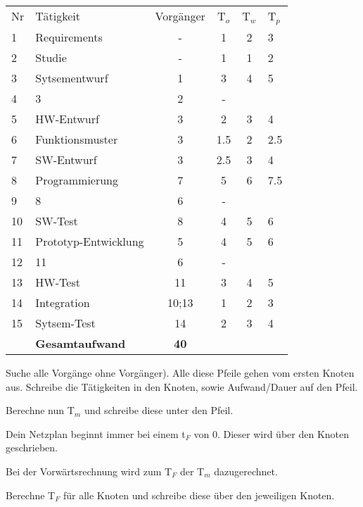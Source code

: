 \documentclass{beamer}
\begin{document}
\begin{frame}[t,shrink=65]
{    \begin{tabular}{l|lcccl}
      \hline
    Nr & Tätigkeit & Vorgänger & T$_{o}$ & T$_{w}$ & T$_{p}$ \\
     1  & Requirements & - & 1 & 2 & 3  \\
     2  & Studie & - & 1 & 1 & 2  \\
     3  & Sytsementwurf & 1 & 3 & 4  & 5  \\
     4  & 3 & 2 & -  \\
     5  & HW-Entwurf& 3 & 2 & 3 & 4 \\
     6  & Funktionsmuster  & 3 & 1.5  & 2 & 2.5 \\
     7  & SW-Entwurf  & 3 & 2.5  & 3 & 4 \\
     8  & Programmierung & 7 & 5 & 6 & 7.5 \\
     9  & 8  & 6 & -  \\
    10  & SW-Test & 8 &  4 & 5& 6 \\
    11  & Prototyp-Entwicklung & 5 & 4 & 5 & 6  \\
	12  & 11  & 6 & - & & \\
	13  & HW-Test  & 11 & 3 & 4 & 5 \\
	14  & Integration & 10;13 & 1 & 2 & 3 \\
	15  & Sytsem-Test & 14 & 2 & 3 & 4 \\
      \hline
        & \textbf{Gesamtaufwand} & \textbf{40}  \\
    \end{tabular}
}

\par\vspace{1cm}\noindent 
\begin{itemize}
{\huge 
	\item<only@+> {Suche alle Vorgänge ohne Vorgänger). Alle diese Pfeile gehen vom ersten Knoten aus. Schreibe die Tätigkeiten in den Knoten, sowie Aufwand/Dauer auf den Pfeil.}
	
	\item<only@+> {Berechne nun T$_{m}$ und schreibe diese unter den Pfeil.}
	
	 \item<only@+> {Dein Netzplan beginnt immer bei einem t$_{F}$ von 0. Dieser wird über den Knoten geschrieben.}
	  
	  \item<only@+> {Bei der Vorwärtsrechnung wird zum T$_{F}$  der T$_{m}$ dazugerechnet.}
	  
	  \item<only@+> {Berechne T$_{F}$ für alle Knoten und schreibe diese über den jeweiligen Knoten.}
	  
}
\end{itemize}
\end{frame}
\end{document}
